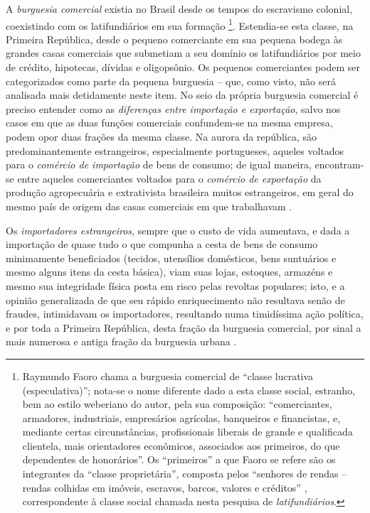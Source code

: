 A \textit{burguesia comercial} existia no Brasil desde os tempos do escravismo colonial, coexistindo com os latifundiários em sua formação \cite[p.~237]{faoro_donos_2001} \footnote{Raymundo Faoro chama a burguesia comercial de ``classe lucrativa (especulativa)''; nota-se o nome diferente dado a esta classe social, estranho, bem ao estilo weberiano do autor, pela sua composição: ``comerciantes, armadores, industriais, empresários agrícolas, banqueiros e financistas, e, mediante certas circunstâncias, profissionais liberais de grande e qualificada clientela, mais orientadores econômicos, associados aos primeiros, do que dependentes de honorários''. Os ``primeiros'' a que Faoro se refere são os integrantes da ``classe proprietária'', composta pelos ``senhores de rendas -- rendas colhidas em imóveis, escravos, barcos, valores e créditos'' \cite[p.~237]{faoro_donos_2001}, correspondente à classe social chamada nesta pesquisa de \textit{latifundiários}.}. Estendia-se esta classe, na Primeira República, desde o pequeno comerciante em sua pequena bodega às grandes casas comerciais que submetiam a seu domínio os latifundiários por meio de crédito, hipotecas, dívidas e oligopsônio. Os pequenos comerciantes podem ser categorizados como parte da pequena burguesia -- que, como visto, não será analisada mais detidamente neste item. No seio da própria burguesia comercial é preciso entender como as \textit{diferenças entre importação e exportação}, salvo nos casos em que as duas funções comerciais confundem-se na mesma empresa, podem opor duas frações da mesma classe. Na aurora da república, são predominantemente estrangeiros, especialmente portugueses, aqueles voltados para o \textit{comércio de importação} de bens de consumo; de igual maneira, encontram-se entre aqueles comerciantes voltados para o \textit{comércio de exportação} da produção agropecuária e extrativista brasileira muitos estrangeiros, em geral do mesmo país de origem das casas comerciais em que trabalhavam \cite[p.~158]{CARONE1970inst}. 

Os \textit{importadores estrangeiros}, sempre que o custo de vida aumentava, e dada a importação de quase tudo o que compunha a cesta de bens de consumo minimamente beneficiados (tecidos, utensílios domésticos, bens suntuários e mesmo alguns itens da cesta básica), viam suas lojas, estoques, armazéns e mesmo sua integridade física posta em risco pelas revoltas populares; isto, e a opinião generalizada de que seu rápido enriquecimento não resultava senão de fraudes, intimidavam os importadores, resultando numa timidíssima ação política, e por toda a Primeira República, desta fração da burguesia comercial, por sinal a mais numerosa e antiga fração da burguesia urbana \cite[pp.~158-159]{CARONE1970inst}. 

